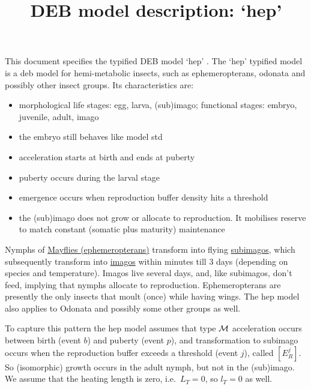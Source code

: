 \documentclass{article}
\title{DEB model description: `hep'}
\begin{document}
\maketitle

This document specifies the typified DEB model  `hep' \citep{MarqAugu2018}.
The `hep' typified model is a {\sc deb} model for hemi-metabolic insects, such as ephemeropterans, odonata and possibly other insect groups. Its characteristics are:
\begin{itemize}
\item morphological life stages: egg, larva, (sub)imago; functional stages: embryo, juvenile, adult, imago
 \item    the embryo still behaves like model std
\item acceleration starts at birth and ends at puberty
\item  puberty occurs during the larval stage
\item emergence occurs when reproduction buffer density hits a threshold
\item the (sub)imago does not grow or allocate to reproduction. It mobilises reserve to match constant (somatic plus maturity) maintenance
\end{itemize}
Nymphs of \href{https://en.wikipedia.org/wiki/Mayfly}{Mayflies (ephemeropterans)} transform into flying \href{https://en.wikipedia.org/wiki/Mayfly#Subimago}{subimagos}, which subsequently transform into \href{https://en.wikipedia.org/wiki/Imago}{imagos} within minutes till 3 days (depending on species and temperature).
Imagos live several days, and, like subimagos, don't feed, implying that nymphs allocate to reproduction.
Ephemeropterans are presently the only insects that moult (once) while having wings.
The hep model also applies to Odonata and possibly some other groups as well.

To capture this pattern the hep model assumes that type $\cal M$ acceleration \citep[section 3.3]{Kooy2014} occurs between birth (event $b$) and puberty (event $p$), and transformation to subimago occurs when the reproduction buffer exceeds a threshold (event $j$), called $[E_R^j]$. 
So (isomorphic) growth occurs in the adult nymph, but not in the (sub)imago.
We assume that the heating length is zero, i.e.\ $L_T = 0$, so $l_T = 0$ as well.
\end{document}
